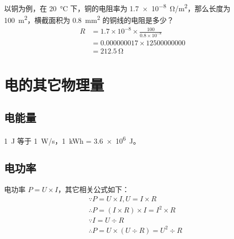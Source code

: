 以铜为例，在 \SI{20}{\degreeCelsius} 下，铜的电阻率为 \SI{1.7e-8}{\ohm/\square\metre}，那么长度为 \SI{100}{\square\metre}，横截面积为 \SI{0.8}{\square\milli\metre} 的铜线的电阻是多少？
\begin{align*}
R &= 1.7\times10^{-8}\times\frac{100}{0.8\times10^{-8}} \\
&= 0.000000017\times12500000000 \\
&= \SI{212.5}{\ohm}
\end{align*}

\section{电的其它物理量}
\subsection{电能量}
\SI{1}{\joule} 等于 \SI{1}{\watt/\second}，\SI{1}{\kWh} = \SI{3.6e6}{\joule}。

\subsection{电功率}
电功率 $P = U \times I$，其它相关公式如下：
\begin{align*}
&\because P = U \times I, U = I \times R \\
&\therefore P = (I \times R) \times I = I^2 \times R \\
&\because I = U \div R \\
&\therefore P = U \times (U \div R) = U^2 \div R
\end{align*}

